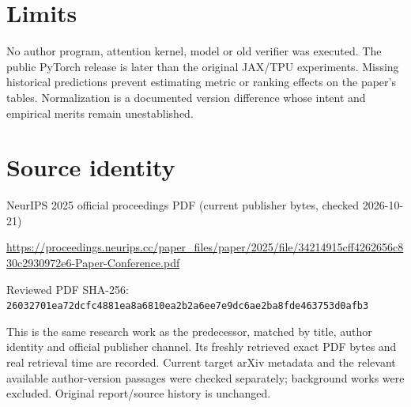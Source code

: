 \documentclass[11pt]{article}
\begin{document}
\section*{Limits}

No author program, attention kernel, model or old verifier was executed. The public PyTorch release is later than the original JAX/TPU experiments. Missing historical predictions prevent estimating metric or ranking effects on the paper’s tables. Normalization is a documented version difference whose intent and empirical merits remain unestablished.\par

\section*{Source identity}

NeurIPS 2025 official proceedings PDF (current publisher bytes, checked 2026-10-21)

\url{https://proceedings.neurips.cc/paper_files/paper/2025/file/34214915cff4262656c830c2930972e6-Paper-Conference.pdf}

Reviewed PDF SHA-256: \nolinkurl{26032701ea72dcfc4881ea8a6810ea2b2a6ee7e9dc6ae2ba8fde463753d0afb3}

This is the same research work as the predecessor, matched by title, author identity and official publisher channel. Its freshly retrieved exact PDF bytes and real retrieval time are recorded. Current target arXiv metadata and the relevant available author-version passages were checked separately; background works were excluded. Original report/source history is unchanged.
\end{document}
